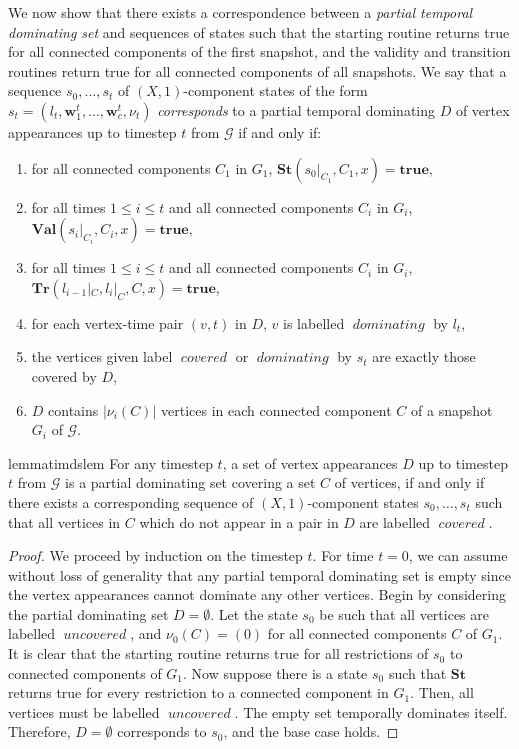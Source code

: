\documentclass[a4paper,UKenglish,cleveref, autoref, thm-restate]{lipics-v2021} %
\DeclareMathOperator{\covered}{\textit{covered}}
\DeclareMathOperator{\uncovered}{\textit{uncovered}}
\DeclareMathOperator{\dominating}{\textit{dominating}}
\begin{document}
\begin{toappendix}
 We now show that there exists a correspondence between a \emph{partial temporal dominating set} and sequences of states such that the starting routine returns true for all connected components of the first snapshot, and the validity and transition routines return true for all connected components of all snapshots. We say that a sequence $s_0, ..., s_t$ of $(X,1)$-component states of the form $s_t=(l_t,\textbf{w}^t_1,\ldots,\textbf{w}^t_c, \nu_t)$ \textit{corresponds} to a partial temporal dominating $D$ of vertex appearances up to timestep $t$ from $\mathcal{G}$ if and only if:
 \begin{enumerate}
     \item for all connected components $C_1$ in $G_1$, $\textbf{St}(s_0|_{C_1}, C_1,x)=\textbf{true}$,
     \item for all times $1\leq i\leq t$ and all connected components $C_{i}$ in $G_{i}$, $\textbf{Val}(s_{i}|_{C_{i}}, C_{i},x)=\textbf{true}$,
     \item for all times $1\leq i\leq t$ and all connected components $C_{i}$ in $G_{i}$, $\textbf{Tr}(l_{i-1}|_C, l_i|_C, C,x)=\textbf{true}$,
     \item for each vertex-time pair $(v,t)$ in $D$, $v$ is labelled $\dominating$ by $l_t$,
     \item the vertices given label $\covered$ or $\dominating$ by $s_t$ are exactly those covered by $D$,
     \item $D$ contains $|\nu_i(C)|$ vertices in each connected component $C$ of a snapshot $G_i$ of $\mathcal{G}$.
 \end{enumerate}
 \begin{restatable}{lemma}{timdslem}\label{lem:temp-dom-tim}
  For any timestep $t$, a set of vertex appearances $D$ up to timestep $t$ from $\mathcal{G}$ is a partial dominating set covering a set $C$ of vertices, if and only if there exists a corresponding sequence of $(X,1)$-component states $s_0, \ldots, s_t$ such that all vertices in $C$ which do not appear in a pair in $D$ are labelled $\covered$.
 \end{restatable}
 \begin{proof}
     We proceed by induction on the timestep $t$. For time $t=0$, we can assume without loss of generality that any partial temporal dominating set is empty since the vertex appearances cannot dominate any other vertices. Begin by considering the partial dominating set $D=\emptyset$. Let the state $s_0$ be such that all vertices are labelled $\uncovered$, and $\nu_0(C)=(0)$ for all connected components $C$ of $G_1$. It is clear that the starting routine returns true for all restrictions of $s_0$ to connected components of $G_1$. Now suppose there is a state $s_0$ such that $\textbf{St}$ returns true for every restriction to a connected component in $G_1$. Then, all vertices must be labelled $\uncovered$. The empty set temporally dominates itself. Therefore, $D=\emptyset$ corresponds to $s_0$, and the base case holds. 


\end{proof}
\end{toappendix}
\end{document}
